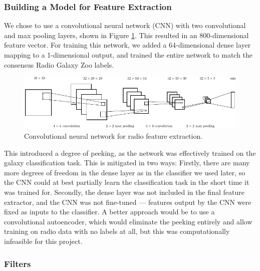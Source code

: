     \subsubsection{Building a Model for Feature Extraction}
    \label{sec:feature-extraction-model}

      We chose to use a convolutional neural network (CNN) with two
      convolutional and max pooling layers, shown in Figure \ref{fig:radio-cnn}.
      This resulted in an 800-dimensional feature vector. For training this
      network, we added a 64-dimensional dense layer mapping to a 1-dimensional
      output, and trained the entire network to match the consensus Radio Galaxy
      Zoo labels.

      \begin{figure}[!ht]
         \centering
         \includegraphics[width=\textwidth]{images/cnn.pdf}
         \caption{Convolutional neural network for radio feature extraction.}
         \label{fig:radio-cnn}
       \end{figure}

       This introduced a degree of peeking, as the network was effectively
       trained on the galaxy classification task. This is mitigated in two ways:
       Firstly, there are many more degrees of freedom in the dense layer as in
       the classifier we used later, so the CNN could at best partially learn
       the classification task in the short time it was trained for. Secondly,
       the dense layer was not included in the final feature extractor, and the
       CNN was not fine-tuned --- features output by the CNN were fixed as
       inputs to the classifier. A better approach would be to use a
       convolutional autoencoder, which would eliminate the peeking entirely and
       allow training on radio data with no labels at all, but this was
       computationally infeasible for this project.

    \subsubsection{Filters}
    \label{sec:image-filters}



